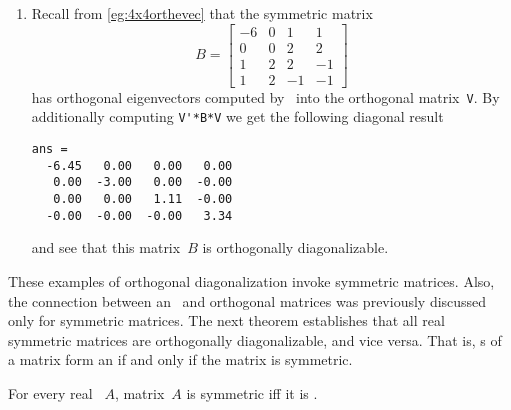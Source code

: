 \begin{example}
\begin{enumerate}[ref=\ref{eg:1orthdiag}(\alph*)]
\item Recall from \autoref{eg:4x4orthevec} that the symmetric matrix
\begin{equation*}
B=\begin{bmatrix} -6 & 0 & 1 & 1
\\ 0 & 0 & 2 & 2
\\ 1 & 2 & 2 & -1
\\ 1 & 2 & -1 & -1 \end{bmatrix}
\end{equation*}
has orthogonal eigenvectors computed by \script\ into the orthogonal matrix~\verb|V|.
By additionally computing \verb|V'*B*V| we get the following diagonal result \twodp
\setbox\ajrqrbox\hbox{}%
\marginajrbox%
\begin{verbatim}
ans =
  -6.45   0.00   0.00   0.00
   0.00  -3.00   0.00  -0.00
   0.00   0.00   1.11  -0.00
  -0.00  -0.00  -0.00   3.34
\end{verbatim}
and see that this matrix~\(B\) is orthogonally diagonalizable.
\end{enumerate}
\end{example}



These examples of orthogonal diagonalization invoke symmetric matrices.
Also, the connection between an \svd\ and orthogonal matrices was previously discussed only for symmetric matrices. 
The next theorem establishes that all real symmetric matrices are orthogonally diagonalizable, and vice versa.
That is, s of a matrix form an  if and only if the matrix is symmetric.
 

\begin{theorem}[spectral] \label{thm:symspec} 
For every real ~\(A\), 
matrix~\(A\) is symmetric iff it is .
\end{theorem}

